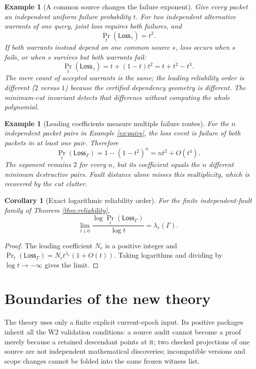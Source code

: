 \documentclass[11pt,letterpaper]{article}
\newtheorem{corollary}[theorem]{Corollary}
\newtheorem{example}[theorem]{Example}
\newcommand{\Gam}{\Gamma}
\begin{document}
\begin{example}[A common source changes the failure exponent]\label{ex:prob}
Give every packet an independent uniform failure probability $t$. For two independent alternative warrants of one query, joint loss requires both failures, and
\[
\Pr_t(\mathsf{Loss}_\gamma)=t^2.
\]
If both warrants instead depend on one common source $s$, loss occurs when $s$ fails, or when $s$ survives but both warrants fail:
\[
\Pr_t(\mathsf{Loss}_\gamma)=t+(1-t)t^2=t+t^2-t^3.
\]
The mere count of accepted warrants is the same; the leading reliability order is different ($2$ versus $1$) because the certified dependency geometry is different. The minimum-cut invariant detects that difference without computing the whole polynomial.
\end{example}

\begin{example}[Leading coefficients measure multiple failure routes]\label{ex:probpairs}
For the $n$ independent packet pairs in Example \ref{ex:pairs}, the loss event is failure of both packets in at least one pair. Therefore
\[
\Pr_t(\mathsf{Loss}_\Gam)=1-(1-t^2)^n
=nt^2+O(t^4).
\]
The exponent remains $2$ for every $n$, but its coefficient equals the $n$ different minimum destructive pairs. Fault distance alone misses this multiplicity, which is recovered by the cut clutter.
\end{example}

\begin{corollary}[Exact logarithmic reliability order]\label{cor:log}
For the finite independent-fault family of Theorem \ref{thm:reliability},
\[
\lim_{t\downarrow0}\frac{\log\Pr_t(\mathsf{Loss}_\Gam)}{\log t}
=\lambda_r(\Gam).
\tag{15}\label{eq:log}
\]
\end{corollary}
\begin{proof}
The leading coefficient $N_r$ is a positive integer and $\Pr_t(\mathsf{Loss}_\Gam)=N_rt^{\lambda_r}(1+O(t))$. Taking logarithms and dividing by $\log t\to-\infty$ gives the limit.
\end{proof}

\section{Boundaries of the new theory}\label{gl-first-W3-s7}
The theory uses only a finite explicit current-epoch input. Its positive packages inherit all the W2 validation conditions: a source audit cannot become a proof merely because a retained descendant points at it; two checked projections of one source are not independent mathematical discoveries; incompatible versions and scope changes cannot be folded into the same frozen witness list.
\end{document}
